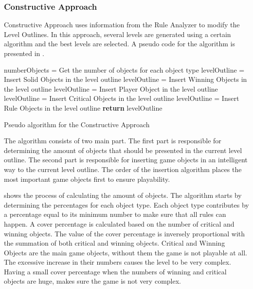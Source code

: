 \subsubsection{Constructive Approach}
Constructive Approach uses information from the Rule Analyzer to modify the Level Outlines. In this approach, several levels are generated using a certain algorithm and the best levels are selected. A pseudo code for the algorithm is presented in .\\

\begin{algorithm}[H]  
	\BlankLine
	numberObjects = Get the number of objects for each object type\;
	\BlankLine
	levelOutline = Insert Solid Objects in the level outline\;
	levelOutline = Insert Winning Objects in the level outline\;
	levelOutline = Insert Player Object in the level outline\;
	levelOutline = Insert Critical Objects in the level outline\;
	levelOutline = Insert Rule Objects in the level outline\;
	\BlankLine
	\textbf{return} levelOutline\;
	\caption{Pseudo algorithm for the Constructive Approach}
	\label{Algorithm:constructiveApproach}
\end{algorithm}
The algorithm consists of two main part. The first part is responsible for determining the amount of objects that should be presented in the current level outline. The second part is responsible for inserting game objects in an intelligent way to the current level outline. The order of the insertion algorithm places the most important game objects first to ensure playability.\\\par

 shows the process of calculating the amount of objects. The algorithm starts by determining the percentages for each object type. Each object type contributes by a percentage equal to its minimum number to make sure that all rules can happen. A cover percentage is calculated based on the number of critical and winning objects. The value of the cover percentage is inversely proportional with the summation of both critical and winning objects. Critical and Winning Objects are the main game objects, without them the game is not playable at all. The excessive increase in their numbers causes the level to be very complex. Having a small cover percentage when the numbers of winning and critical objects are huge, makes sure the game is not very complex.\\

